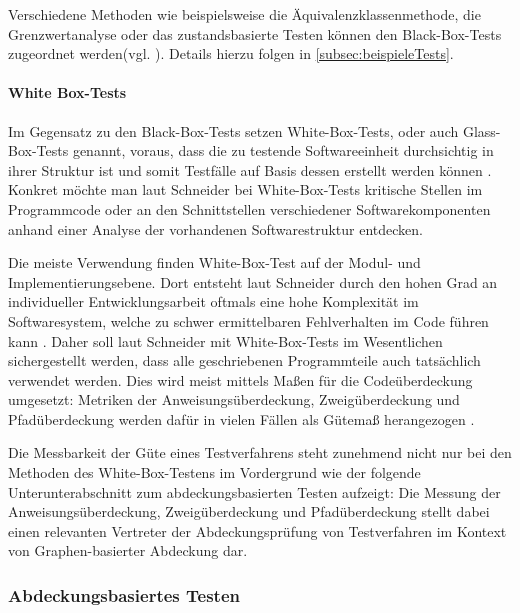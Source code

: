 Verschiedene Methoden wie beispielsweise die Äquivalenzklassenmethode, die Grenzwertanalyse oder das zustandsbasierte Testen können den Black-Box-Tests zugeordnet werden(vgl. \cite[S. 94 ff.]{schneider2012abenteuer}). Details hierzu folgen in \autoref{subsec:beispieleTests}.

\paragraph{White Box-Tests}

Im Gegensatz zu den Black-Box-Tests setzen White-Box-Tests, oder auch Glass-Box-Tests genannt, voraus, dass die zu testende Softwareeinheit durchsichtig in ihrer Struktur ist und somit Testfälle auf Basis dessen erstellt werden können \cite[S. 91]{schneider2012abenteuer}. Konkret möchte man laut Schneider \cite[S. 91]{schneider2012abenteuer} bei White-Box-Tests kritische Stellen im Programmcode oder an den Schnittstellen verschiedener Softwarekomponenten anhand einer Analyse der vorhandenen Softwarestruktur entdecken.

Die meiste Verwendung finden White-Box-Test auf der Modul- und Implementierungsebene. Dort entsteht laut Schneider durch den hohen Grad an individueller Entwicklungsarbeit oftmals eine hohe Komplexität im Softwaresystem, welche zu schwer ermittelbaren Fehlverhalten im Code führen kann \cite[S. 108]{schneider2012abenteuer}. Daher soll laut Schneider \cite[S. 108 ff.]{schneider2012abenteuer} mit White-Box-Tests im Wesentlichen sichergestellt werden, dass alle geschriebenen Programmteile auch tatsächlich verwendet werden. Dies wird meist mittels Maßen für die Codeüberdeckung umgesetzt: Metriken der Anweisungsüberdeckung, Zweigüberdeckung und Pfadüberdeckung werden dafür in vielen Fällen als Gütemaß herangezogen \cite[S. 109 ff.]{schneider2012abenteuer}. 

Die Messbarkeit der Güte eines Testverfahrens steht zunehmend nicht nur bei den Methoden des White-Box-Testens im Vordergrund wie der folgende Unterunterabschnitt zum abdeckungsbasierten Testen aufzeigt: Die Messung der Anweisungsüberdeckung, Zweigüberdeckung und Pfadüberdeckung stellt dabei einen relevanten Vertreter der Abdeckungsprüfung von Testverfahren im Kontext von Graphen-basierter Abdeckung dar.

\subsubsection{Abdeckungsbasiertes Testen}\label{subsec:abdeckung}

